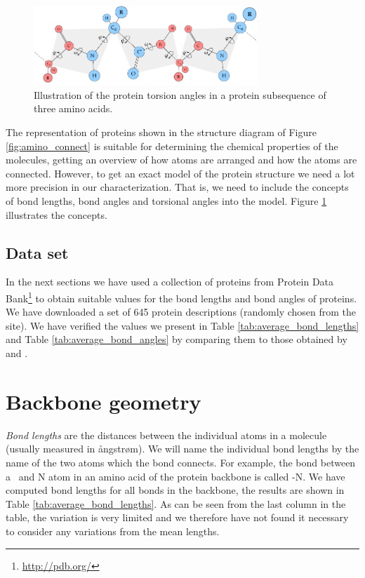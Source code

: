 \begin{figure}
  \centering
  \includegraphics[width=0.75\textwidth]{figures/protein-torsion-angles}
  \caption{Illustration of the protein torsion angles in a protein
    subsequence of three amino acids.}
  \label{fig:protein-torsion-angles}
\end{figure}

The representation of proteins shown in the structure diagram of
Figure \ref{fig:amino_connect} is suitable for determining the
chemical properties of the molecules, getting an overview of how atoms
are arranged and how the atoms are connected. However, to get an exact
model of the protein structure we need a lot more precision in our
characterization. That is, we need to include the concepts of bond
lengths, bond angles and torsional angles into the model.  Figure
\ref{fig:protein-torsion-angles} illustrates the concepts.

\subsection{Data set}
In the next sections we have used a collection of proteins from
Protein Data Bank\footnote{\url{http://pdb.org/}} to obtain suitable
values for the bond lengths and bond angles of proteins. We have
downloaded a set of 645 protein descriptions (randomly chosen from the
site). We have verified the values we present in Table
\ref{tab:average_bond_lengths} and Table \ref{tab:average_bond_angles}
by comparing them to those obtained by \cite{probik} and
\cite{laskowski1993main}.

\section{Backbone geometry}
\textit{Bond lengths} are the distances between the individual atoms
in a molecule (usually measured in ångstrøm). We will name the
individual bond lengths by the name of the two atoms which the bond
connects. For example, the bond between a \Ca\ and N atom in an amino acid of
the protein backbone is called \Ca -N. We have computed bond lengths
for all bonds in the backbone, the results are shown in Table
\ref{tab:average_bond_lengths}. As can be seen from the last column in
the table, the variation is very limited and we therefore have not
found it necessary to consider any variations from the mean
lengths. 

